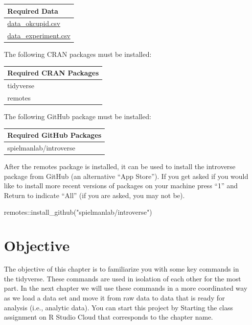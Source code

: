 \documentclass[
]{krantz}
\makeatletter
\newenvironment{Shaded}{\begin{snugshade}}{\end{snugshade}}
\newcommand{\FunctionTok}[1]{\textcolor[rgb]{0,0,0}{#1}}
\newcommand{\NormalTok}[1]{#1}
\newcommand{\SpecialCharTok}[1]{\textcolor[rgb]{0,0,0}{#1}}
\newcommand{\StringTok}[1]{\textcolor[rgb]{0.5,0.5,0.5}{#1}}
\newenvironment{kframe}{%
\medskip{}
\setlength{\fboxsep}{.8em}
 \def\at@end@of@kframe{}%
 \ifinner\ifhmode%
  \def\at@end@of@kframe{\end{minipage}}%
  \begin{minipage}{\columnwidth}%
 \fi\fi%
 \def\FrameCommand##1{\hskip\@totalleftmargin \hskip-\fboxsep
 \colorbox{shadecolor}{##1}\hskip-\fboxsep
     \hskip-\linewidth \hskip-\@totalleftmargin \hskip\columnwidth}%
 \MakeFramed {\advance\hsize-\width
   \@totalleftmargin\z@ \linewidth\hsize
   \@setminipage}}%
 {\par\unskip\endMakeFramed%
 \at@end@of@kframe}
\renewenvironment{Shaded}{\begin{kframe}}{\end{kframe}}
\makeatother
\begin{document}
\begin{longtable}[]{@{}l@{}}
\toprule
Required Data \\
\midrule
\endhead
\url{data_okcupid.csv} \\
\url{data_experiment.csv} \\
\bottomrule
\end{longtable}

The following CRAN packages must be installed:

\begin{longtable}[]{@{}l@{}}
\toprule
Required CRAN Packages \\
\midrule
\endhead
tidyverse \\
remotes \\
\bottomrule
\end{longtable}

The following GitHub package must be installed:

\begin{longtable}[]{@{}l@{}}
\toprule
Required GitHub Packages \\
\midrule
\endhead
spielmanlab/introverse \\
\bottomrule
\end{longtable}

After the remotes package is installed, it can be used to install the introverse package from GitHub (an alternative ``App Store''). If you get asked if you would like to install more recent versions of packages on your machine press ``1'' and Return to indicate ``All'' (if you are asked, you may not be).

\begin{Shaded}
\begin{Highlighting}[]
\NormalTok{remotes}\SpecialCharTok{::}\FunctionTok{install\_github}\NormalTok{(}\StringTok{"spielmanlab/introverse"}\NormalTok{)}
\end{Highlighting}
\end{Shaded}

\hypertarget{objective}{%
\section{Objective}\label{objective}}

The objective of this chapter is to familiarize you with some key commands in the tidyverse. These commands are used in isolation of each other for the most part. In the next chapter we will use these commands in a more coordinated way as we load a data set and move it from raw data to data that is ready for analysis (i.e., analytic data). You can start this project by Starting the class assignment on R Studio Cloud that corresponds to the chapter name.
\end{document}
